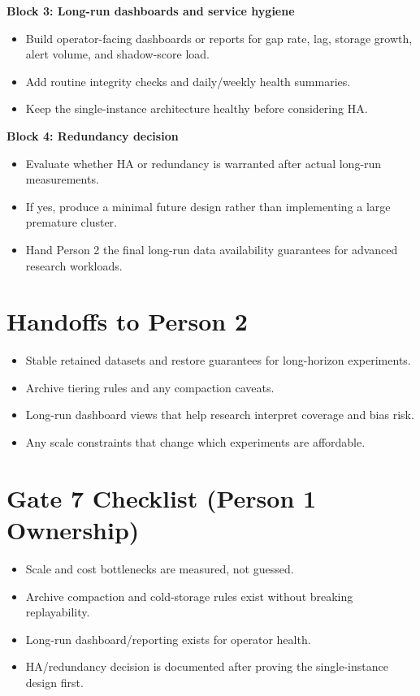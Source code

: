 \documentclass{article}
\begin{document}
\textbf{Block 3: Long-run dashboards and service hygiene}
\begin{itemize}
\item Build operator-facing dashboards or reports for gap rate, lag, storage growth, alert volume, and shadow-score load.
\item Add routine integrity checks and daily/weekly health summaries.
\item Keep the single-instance architecture healthy before considering HA.
\end{itemize}

\textbf{Block 4: Redundancy decision}
\begin{itemize}
\item Evaluate whether HA or redundancy is warranted after actual long-run measurements.
\item If yes, produce a minimal future design rather than implementing a large premature cluster.
\item Hand Person 2 the final long-run data availability guarantees for advanced research workloads.
\end{itemize}

\section*{Handoffs to Person 2}
\begin{itemize}
\item Stable retained datasets and restore guarantees for long-horizon experiments.
\item Archive tiering rules and any compaction caveats.
\item Long-run dashboard views that help research interpret coverage and bias risk.
\item Any scale constraints that change which experiments are affordable.
\end{itemize}

\section*{Gate 7 Checklist (Person 1 Ownership)}
\begin{itemize}
\item Scale and cost bottlenecks are measured, not guessed.
\item Archive compaction and cold-storage rules exist without breaking replayability.
\item Long-run dashboard/reporting exists for operator health.
\item HA/redundancy decision is documented after proving the single-instance design first.
\end{itemize}
\end{document}
